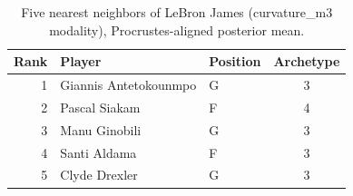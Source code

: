\begin{table}[htbp]
  \centering\small
  \begin{tabular}{rllc}
    \toprule
    Rank & Player & Position & Archetype \\
    \midrule
    1 & Giannis Antetokounmpo & G & 3 \\
    2 & Pascal Siakam & F & 4 \\
    3 & Manu Ginobili & G & 3 \\
    4 & Santi Aldama & F & 3 \\
    5 & Clyde Drexler & G & 3 \\
    \bottomrule
  \end{tabular}
  \caption{Five nearest neighbors of LeBron James (curvature_m3 modality), Procrustes-aligned posterior mean.}
  \label{tab:LeBron_James_neighbors_curvature_m3}
\end{table}

